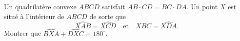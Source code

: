 Un quadrilatère convexe $ABCD$ satisfait $AB \cdot CD = BC \cdot DA$. Un point $X$ est situé à l'intérieur de
$ABCD$ de sorte que
\[
\widehat{XAB} = \widehat{XCD} \quad \text{et} \quad \widehat{XBC} = \widehat{XDA}.
\]
Montrer que $\widehat{BXA} + \widehat{DXC} = 180^\circ$.
